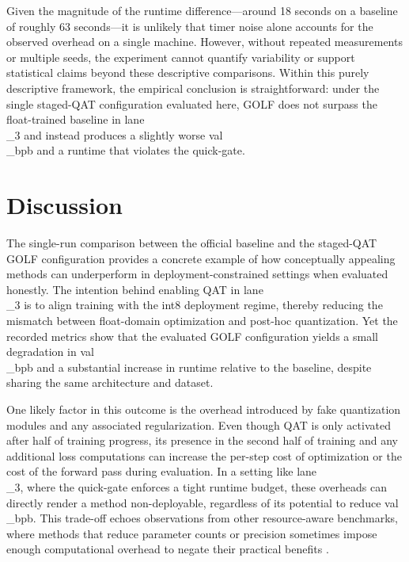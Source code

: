 \documentclass{article}
\begin{document}
Given the magnitude of the runtime difference---around 18 seconds on a baseline of roughly 63 seconds---it is unlikely that timer noise alone accounts for the observed overhead on a single machine. However, without repeated measurements or multiple seeds, the experiment cannot quantify variability or support statistical claims beyond these descriptive comparisons. Within this purely descriptive framework, the empirical conclusion is straightforward: under the single staged-QAT configuration evaluated here, GOLF does not surpass the float-trained baseline in lane\\_3 and instead produces a slightly worse val\\_bpb and a runtime that violates the quick-gate.

\section{Discussion}

\label{sec:discussion}

The single-run comparison between the official baseline and the staged-QAT GOLF configuration provides a concrete example of how conceptually appealing methods can underperform in deployment-constrained settings when evaluated honestly. The intention behind enabling QAT in lane\\_3 is to align training with the int8 deployment regime, thereby reducing the mismatch between float-domain optimization and post-hoc quantization. Yet the recorded metrics show that the evaluated GOLF configuration yields a small degradation in val\\_bpb and a substantial increase in runtime relative to the baseline, despite sharing the same architecture and dataset.

One likely factor in this outcome is the overhead introduced by fake quantization modules and any associated regularization. Even though QAT is only activated after half of training progress, its presence in the second half of training and any additional loss computations can increase the per-step cost of optimization or the cost of the forward pass during evaluation. In a setting like lane\\_3, where the quick-gate enforces a tight runtime budget, these overheads can directly render a method non-deployable, regardless of its potential to reduce val\\_bpb. This trade-off echoes observations from other resource-aware benchmarks, where methods that reduce parameter counts or precision sometimes impose enough computational overhead to negate their practical benefits \cite{banbury2021mlperf, desislavov2021compute}.
\end{document}
